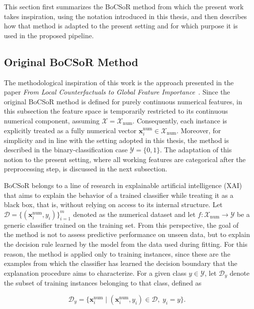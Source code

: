This section first summarizes the BoCSoR method from which the present work takes inspiration, using the notation introduced in this thesis, and then describes how that method is adapted to the present setting and for which purpose it is used in the proposed pipeline.

\subsection{Original BoCSoR Method}

The methodological inspiration of this work is the approach presented in the paper \emph{From Local Counterfactuals to Global Feature Importance}~\cite{alfeo2023bocsor}. Since the original BoCSoR method is defined for purely continuous numerical features, in this subsection the feature space is temporarily restricted to its continuous numerical component, assuming $\mathcal{X} = \mathcal{X}_{\mathrm{num}}$. Consequently, each instance is explicitly treated as a fully numerical vector $\mathbf{x}^{\mathrm{num}}_i \in \mathcal{X}_{\mathrm{num}}$. Moreover, for simplicity and in line with the setting adopted in this thesis, the method is described in the binary-classification case $\mathcal{Y}=\{0,1\}$. The adaptation of this notion to the present setting, where all working features are categorical after the preprocessing step, is discussed in the next subsection.

BoCSoR belongs to a line of research in explainable artificial intelligence (XAI) that aims to explain the behavior of a trained classifier while treating it as a black box, that is, without relying on access to its internal structure. Let $\mathcal{D}=\{(\mathbf{x}^{\mathrm{num}}_i,y_i)\}_{i=1}^m$ denoted as the numerical dataset and let $f:\mathcal{X}_{\mathrm{num}}\rightarrow\mathcal{Y}$ be a generic classifier trained on the training set. From this perspective, the goal of the method is not to assess predictive performance on unseen data, but to explain the decision rule learned by the model from the data used during fitting. For this reason, the method is applied only to training instances, since these are the examples from which the classifier has learned the decision boundary that the explanation procedure aims to characterize. For a given class $y \in \mathcal{Y}$, let $\mathcal{D}_y$ denote the subset of training instances belonging to that class, defined as

\begin{equation}
  \mathcal{D}_y = \{ \mathbf{x}^{\mathrm{num}}_i \mid (\mathbf{x}^{\mathrm{num}}_i, y_i) \in \mathcal{D}, \; y_i = y \}.
\end{equation}

